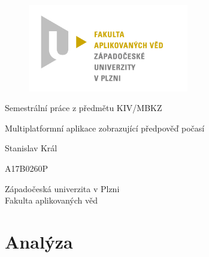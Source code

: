\documentclass[12pt, a4paper]{article}
\let\oldsection\section
\renewcommand\section{\clearpage\oldsection}
\begin{document}
	\renewcommand{\lstlistingname}{Ukázka zprávy}
	\renewcommand{\lstlistlistingname}{Seznam ukázek}
    \begin{titlepage}

       \centering

       \vspace*{\baselineskip}

       \begin{figure}[H]
          \centering
          \includegraphics[width=7cm]{img/fav-logo.jpg}
       \end{figure}

       \vspace*{1\baselineskip}
       {\sc Semestrální práce z předmětu KIV/MBKZ}
       \vspace*{1\baselineskip}

       \vspace{0.75\baselineskip}

       {\LARGE\sc Multiplatformní aplikace zobrazující předpověď počasí\\}

       \vspace{4\baselineskip}
       
		\vspace{0.5\baselineskip}

       
       {\sc\Large Stanislav Král \\}

       \vspace{0.5\baselineskip}

       {A17B0260P}

       \vfill

       {\sc Západočeská univerzita v Plzni\\
       Fakulta aplikovaných věd}


    \end{titlepage}


    \tableofcontents
    \pagebreak


   \section{Analýza}
\end{document}
